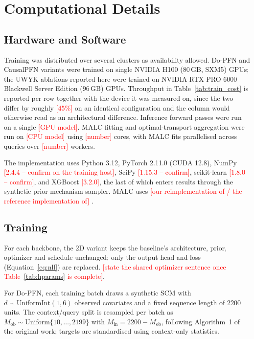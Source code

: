 \providecommand{\ph}[1]{\textcolor{red}{[#1]}}
\section{Computational Details}
\label{app:compute}

\subsection{Hardware and Software}
\label{app:compute:hw}

Training was distributed over several clusters as availability allowed. Do-PFN
and CausalPFN variants were trained on single NVIDIA H100 (80\,GB, SXM5) GPUs;
the UWYK ablations reported here were trained on NVIDIA RTX PRO 6000 Blackwell
Server Edition (96\,GB) GPUs. Throughput in Table~\ref{tab:train_cost} is
reported per row together with the device it was measured on, since the two
differ by roughly \ph{45\%} on an identical configuration and the column would
otherwise read as an architectural difference. Inference forward passes were run
on a single \ph{GPU model}. MALC fitting and optimal-transport aggregation were
run on \ph{CPU model} using \ph{number} cores, with MALC fits parallelised across
queries over \ph{number} workers.

The implementation uses Python 3.12, PyTorch 2.11.0 (CUDA 12.8), NumPy
\ph{2.4.4 -- confirm on the training host}, SciPy \ph{1.15.3 -- confirm},
scikit-learn \ph{1.8.0 -- confirm}, and XGBoost \ph{3.2.0}, the last of which
enters results through the synthetic-prior mechanism sampler. MALC uses
\ph{our reimplementation of / the reference implementation of}
\citet{danisman2026malc}.

\subsection{Training}
\label{app:compute:train}

For each backbone, the 2D variant keeps the baseline's architecture, prior,
optimizer and schedule unchanged; only the output head and loss
(Equation~\ref{eq:nll}) are replaced. \ph{state the shared optimizer sentence
once Table~\ref{tab:hparams} is complete}.

For Do-PFN, each training batch draws a synthetic SCM with
$d \sim \mathrm{UniformInt}(1,6)$ observed covariates and a fixed sequence length
of $2200$ units. The context/query split is resampled per batch as
$M_{\mathrm{ob}} \sim \mathrm{Uniform}\{10,\dots,2199\}$ with
$M_{\mathrm{in}} = 2200 - M_{\mathrm{ob}}$, following Algorithm~1 of the original
work; targets are standardised using context-only statistics.

